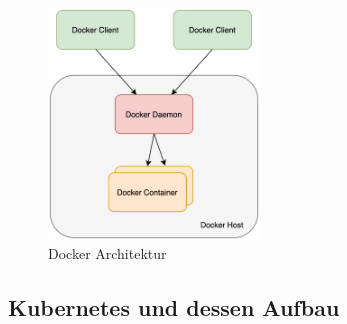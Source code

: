 \begin{figure}[bth] 
	\centering
	\includegraphics[width=0.5\textwidth]{Graphics/DockerArchitektur.png}
	\caption{Docker Architektur}
\end{figure}

\subsection{Kubernetes und dessen Aufbau}

